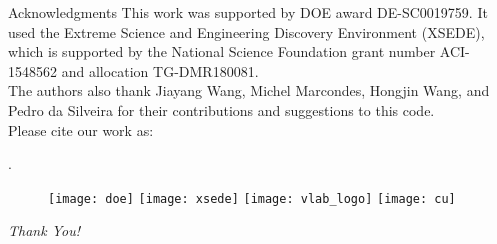 \begin{frame}{Acknowledgments}
    This work was supported by DOE award DE-SC0019759. It used the Extreme
    Science and Engineering Discovery Environment (XSEDE), which is supported by
    the National Science Foundation grant number ACI-1548562 and allocation
    TG-DMR180081.\\

    The authors also thank Jiayang Wang, Michel Marcondes, Hongjin Wang, and Pedro da Silveira
    for their contributions and suggestions to this code.\\

    Please cite our work as:

    \cite{zhang2021textttexpress}.

    \begin{figure}
        \centering
        \texttt{[image: doe]}
        \hfill
        \texttt{[image: xsede]}
        \hfill
        \texttt{[image: vlab\_logo]}
        \hfill
        \texttt{[image: cu]}
        \label{fig:thank}
    \end{figure}
\end{frame}

\begin{frame}[c]
    \centering \fontsize{40}{50}\selectfont\emph{Thank You!}
\end{frame}

